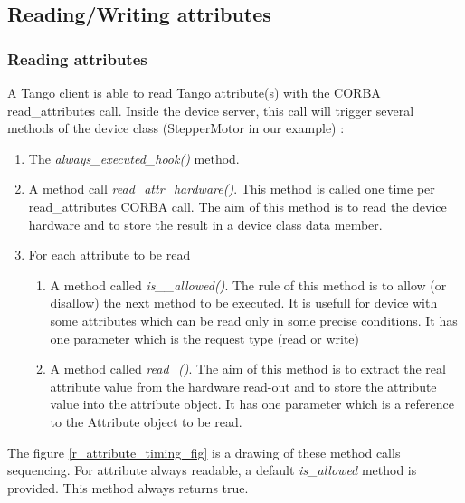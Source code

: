 \subsection{Reading/Writing attributes}


\subsubsection{Reading attributes}

A Tango client is able to read Tango attribute(s)
with the CORBA read\_attributes call. Inside
the device server, this call will trigger several methods of the device
class (StepperMotor in our example) :
\begin{enumerate}
\item The \emph{always\_executed\_hook()}
method. 
\item A method call \emph{read\_attr\_hardware()}.
This method is called one time per read\_attributes CORBA call. The
aim of this method is to read the device hardware and to store the
result in a device class data member.
\item For each attribute to be read

\begin{enumerate}
\item A method called \emph{is\_<att name>\_allowed()}. The rule of this
method is to allow (or disallow) the next method to be executed. It
is usefull for device with some attributes which can be read only
in some precise conditions. It has one parameter which is the request
type (read or write)
\item A method called \emph{read\_<att name>()}. The aim of this method
is to extract the real attribute value from the hardware read-out
and to store the attribute value into the attribute object. It has
one parameter which is a reference to the Attribute object to be read.
\end{enumerate}
\end{enumerate}
The figure \ref{r_attribute_timing_fig} is a drawing of these method
calls sequencing. For attribute always readable, a default \emph{is\_allowed}
method is provided. This method always returns true.
